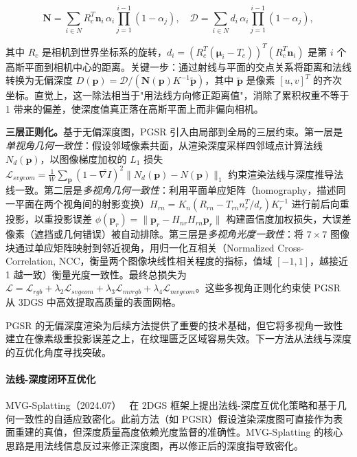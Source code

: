 \begin{equation}
\bm{N} = \sum_{i \in N} R_c^T \bm{n}_i \, \alpha_i \prod_{j=1}^{i-1}(1-\alpha_j), \quad \mathcal{D} = \sum_{i \in N} d_i \, \alpha_i \prod_{j=1}^{i-1}(1-\alpha_j),
\end{equation}

其中 $R_c$ 是相机到世界坐标系的旋转，$d_i = (R_c^T(\bm{\mu}_i - T_c))^T(R_c^T \bm{n}_i)$ 是第 $i$ 个高斯平面到相机中心的距离。关键一步：通过射线与平面的交点关系将距离和法线转换为无偏深度 $D(\bm{p}) = \mathcal{D} / (\bm{N}(\bm{p}) K^{-1} \tilde{\bm{p}})$，其中 $\tilde{\bm{p}}$ 是像素 $[u,v]^T$ 的齐次坐标。直觉上，这一除法相当于"用法线方向修正距离值"，消除了累积权重不等于 1 带来的偏差，使深度值真正落在高斯平面上而非偏向相机。

\textbf{三层正则化。}基于无偏深度图，PGSR 引入由局部到全局的三层约束。第一层是\emph{单视角几何一致性}：假设邻域像素共面，从渲染深度采样四邻域点计算法线 $N_d(\bm{p})$，以图像梯度加权的 $L_1$ 损失 $\mathcal{L}_{svgeom} = \frac{1}{W}\sum_{\bm{p}} (1-\overline{\nabla I})^2 \|N_d(\bm{p}) - N(\bm{p})\|_1$ 约束渲染法线与深度推导法线一致。第二层是\emph{多视角几何一致性}：利用平面单应矩阵（homography，描述同一平面在两个视角间的射影变换）$H_{rn} = K_n(R_{rn} - T_{rn}n_r^T / d_r)K_r^{-1}$ 进行前后向重投影，以重投影误差 $\phi(\bm{p}_r) = \|\bm{p}_r - H_{nr}H_{rn}\bm{p}_r\|$ 构建置信度加权损失，大误差像素（遮挡或几何错误）被自动排除。第三层是\emph{多视角光度一致性}：将 $7\times 7$ 图像块通过单应矩阵映射到邻近视角，用归一化互相关（Normalized Cross-Correlation, NCC，衡量两个图像块线性相关程度的指标，值域 $[-1,1]$，越接近 1 越一致）衡量光度一致性。最终总损失为 $\mathcal{L} = \mathcal{L}_{rgb} + \lambda_2 \mathcal{L}_{svgeom} + \lambda_3 \mathcal{L}_{mvrgb} + \lambda_4 \mathcal{L}_{mvgeom}$。这些多视角正则化约束使 PGSR 从 3DGS 中高效提取高质量的表面网格。

PGSR 的无偏深度渲染为后续方法提供了重要的技术基础，但它将多视角一致性建立在像素级重投影误差之上，在纹理匮乏区域容易失效。下一方法从法线与深度的互优化角度寻找突破。

\paragraph{法线-深度闭环互优化}

MVG-Splatting（2024.07）~\cite{2407_11840} 在 2DGS 框架上提出法线-深度互优化策略和基于几何一致性的自适应致密化。此前方法（如 PGSR）假设渲染深度图可直接作为表面重建的真值，但深度质量高度依赖光度监督的准确性。MVG-Splatting 的核心思路是用法线信息反过来修正深度图，再以修正后的深度指导致密化。

